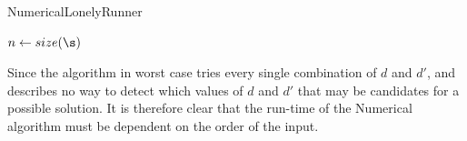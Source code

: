 \begin{algorithm}[H]
  \caption{NumericalLonelyRunner}
  \highlights
  
  $n \gets size(\s)$

  \return \no
\end{algorithm}

Since the algorithm in worst case tries every single combination of
$d$ and $d\prime$, and \cite{invis} describes no way to detect which
values of $d$ and $d\prime$ that may be candidates for a possible
solution. It is therefore clear that the run-time of the Numerical
algorithm must be dependent on the order of the input.

